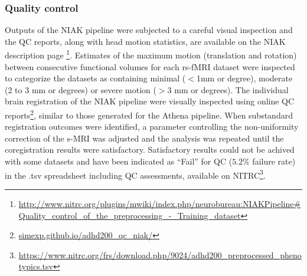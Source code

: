 \documentclass[preprint,12pt,3p]{elsarticle}
\begin{document}
\subsubsection{Quality control}

Outputs of the NIAK pipeline were subjected to a careful visual inspection and the QC reports, along with head motion statistics, are available on the NIAK description page \footnote{\url{http://www.nitrc.org/plugins/mwiki/index.php/neurobureau:NIAKPipeline#Quality_control_of_the_preprocessing_-_Training_dataset}}. Estimates of the maximum motion (translation and rotation) between consecutive functional volumes for each rs-fMRI dataset were inspected to categorize the datasets as containing minimal ($<$1mm or degree), moderate (2 to 3 mm or degrees) or severe motion ($>$3 mm or degrees). The individual brain registration of the NIAK pipeline were visually inspected using online QC reports\footnote{\url{simexp.github.io/adhd200_qc_niak/}}, similar to those generated for the Athena pipeline. When substandard registration outcomes were identified, a parameter controlling the non-uniformity correction of the s-MRI was adjusted and the analysis was repeated until the coregistration results were satisfactory. Satisfactory results could not be achived with some datasets and have been indicated as ``Fail'' for QC ($5.2\%$ failure rate) in the .tsv spreadsheet including QC assessments, available on NITRC\footnote{\url{https://www.nitrc.org/frs/download.php/9024/adhd200_preprocessed_phenotypics.tsv}}. 
\end{document}
